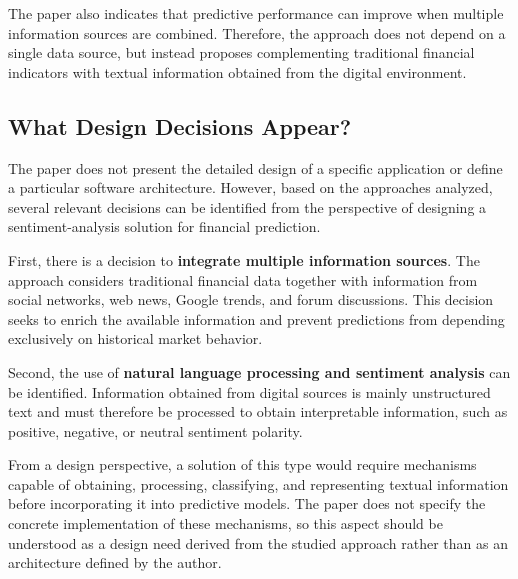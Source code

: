 \vspace{2mm}

The paper also indicates that predictive performance can improve when multiple information sources are combined. Therefore, the approach does not depend on a single data source, but instead proposes complementing traditional financial indicators with textual information obtained from the digital environment.


\subsection{What Design Decisions Appear?}
\vspace{2mm}

The paper does not present the detailed design of a specific application or define a particular software architecture. However, based on the approaches analyzed, several relevant decisions can be identified from the perspective of designing a sentiment-analysis solution for financial prediction.

\vspace{2mm}

First, there is a decision to \textbf{integrate multiple information sources}. The approach considers traditional financial data together with information from social networks, web news, Google trends, and forum discussions. This decision seeks to enrich the available information and prevent predictions from depending exclusively on historical market behavior.

\vspace{2mm}

Second, the use of \textbf{natural language processing and sentiment analysis} can be identified. Information obtained from digital sources is mainly unstructured text and must therefore be processed to obtain interpretable information, such as positive, negative, or neutral sentiment polarity.

\vspace{2mm}

From a design perspective, a solution of this type would require mechanisms capable of obtaining, processing, classifying, and representing textual information before incorporating it into predictive models. The paper does not specify the concrete implementation of these mechanisms, so this aspect should be understood as a design need derived from the studied approach rather than as an architecture defined by the author.

\vspace{2mm}

